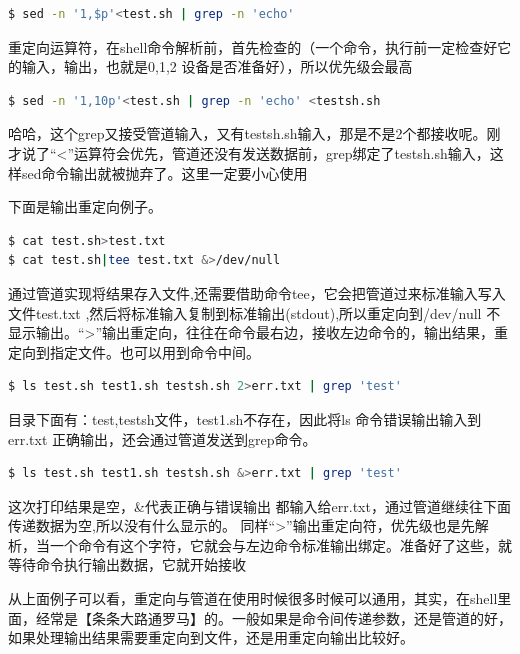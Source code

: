 \documentclass[doctor,openright,twoside]{sjtuthesis}
\theoremstyle{plain}
\theoremstyle{definition}
\theoremstyle{remark}
\theoremstyle{ocrenumbox}
\theoremstyle{plain}
\begin{document}
\begin{lstlisting}[language=bash]
$ sed -n '1,$p'<test.sh | grep -n 'echo'
\end{lstlisting}

重定向运算符，在shell命令解析前，首先检查的（一个命令，执行前一定检查好它的输入，输出，也就是0,1,2 设备是否准备好），所以优先级会最高

\begin{lstlisting}[language=bash]
$ sed -n '1,10p'<test.sh | grep -n 'echo' <testsh.sh
\end{lstlisting}

哈哈，这个grep又接受管道输入，又有testsh.sh输入，那是不是2个都接收呢。刚才说了``\textless{}''运算符会优先，管道还没有发送数据前，grep绑定了testsh.sh输入，这样sed命令输出就被抛弃了。这里一定要小心使用

下面是输出重定向例子。

\begin{lstlisting}[language=bash]
$ cat test.sh>test.txt
$ cat test.sh|tee test.txt &>/dev/null
\end{lstlisting}

通过管道实现将结果存入文件,还需要借助命令tee，它会把管道过来标准输入写入文件test.txt ,然后将标准输入复制到标准输出(stdout),所以重定向到/dev/null 不显示输出。``\textgreater{}''输出重定向，往往在命令最右边，接收左边命令的，输出结果，重定向到指定文件。也可以用到命令中间。

\begin{lstlisting}[language=bash]
$ ls test.sh test1.sh testsh.sh 2>err.txt | grep 'test'
\end{lstlisting}

目录下面有：test,testsh文件，test1.sh不存在，因此将ls 命令错误输出输入到err.txt 正确输出，还会通过管道发送到grep命令。

\begin{lstlisting}[language=bash]
$ ls test.sh test1.sh testsh.sh &>err.txt | grep 'test'
\end{lstlisting}

这次打印结果是空，\&代表正确与错误输出 都输入给err.txt，通过管道继续往下面传递数据为空,所以没有什么显示的。
同样``\textgreater{}''输出重定向符，优先级也是先解析，当一个命令有这个字符，它就会与左边命令标准输出绑定。准备好了这些，就等待命令执行输出数据，它就开始接收

从上面例子可以看，重定向与管道在使用时候很多时候可以通用，其实，在shell里面，经常是【条条大路通罗马】的。一般如果是命令间传递参数，还是管道的好，如果处理输出结果需要重定向到文件，还是用重定向输出比较好。
\end{document}
